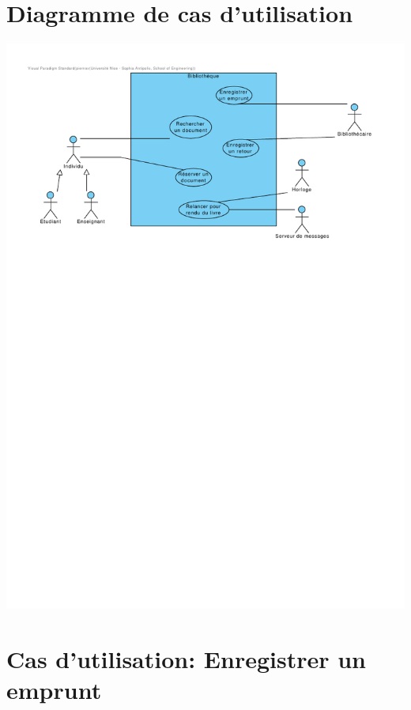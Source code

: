 \documentclass{article}
\begin{document}
\section{Diagramme de cas d'utilisation}

\vspace{-5em}
\hspace*{-8em}\includegraphics[scale=1.5]{use_case}
\vspace*{-4em}

\section{Cas d'utilisation: Enregistrer un emprunt}
\end{document}
